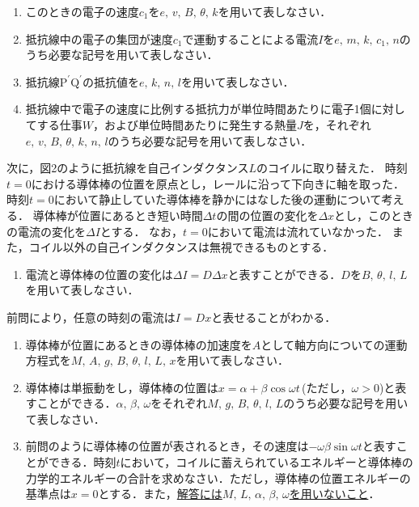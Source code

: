 \begin{enumerate}[（1）]
  \setlength{\leftskip}{-1zw}
  \setlength{\itemindent}{1zw}\setlength{\labelsep}{0.5zw}
  \setlength{\labelwidth}{1zw}\setlength{\leftmargin}{1zw}
  \setlength{\itemsep}{0.5\baselineskip}
  \addtocounter{enumi}{3}
  \item このときの電子の速度$c_1$を$e,\,v,\,B,\,\theta,\,k$を用いて表しなさい．
  \item 抵抗線中の電子の集団が速度$c_1$で運動することによる電流$I$を$e,\,m,\,k,\,c_1,\,n$のうち必要な記号を用いて表しなさい．
  \item 抵抗線$\text{P}^\prime\text{Q}^\prime$の抵抗値を$e,\,k,\,n,\,l$を用いて表しなさい．
  \item 抵抗線中で電子の速度に比例する抵抗力が単位時間あたりに電子1個に対してする仕事$W$，および単位時間あたりに発生する熱量$J$を，それぞれ$e,\,v,\,B,\,\theta,\,k,\,n,\,l$のうち必要な記号を用いて表しなさい．
\end{enumerate}

次に，図2のように抵抗線を自己インダクタンス$L$のコイルに取り替えた．
時刻$t=0$における導体棒の位置を原点とし，レールに沿って下向きに\x 軸を取った．
時刻$t=0$において静止していた導体棒を静かにはなした後の運動について考える．
導体棒が位置\x にあるとき短い時間$\Delta t$の間の位置の変化を$\Delta x$とし，このときの電流の変化を$\Delta I$とする．
なお，$t=0$において電流は流れていなかった．
また，コイル以外の自己インダクタンスは無視できるものとする．

\begin{enumerate}[（1）]
  \setlength{\leftskip}{-1zw}
  \setlength{\itemindent}{1zw}\setlength{\labelsep}{0.5zw}
  \setlength{\labelwidth}{1zw}\setlength{\leftmargin}{1zw}
  \setlength{\itemsep}{0.5\baselineskip}
  \addtocounter{enumi}{7}
  \item 電流と導体棒の位置の変化は$\Delta I=D\Delta x$と表すことができる．$D$を$B,\,\theta,\,l,\,L$を用いて表しなさい．
\end{enumerate}

前問により，任意の時刻の電流は$I=Dx$と表せることがわかる．

\begin{enumerate}[（1）]
  \setlength{\leftskip}{-1zw}
  \setlength{\itemindent}{1zw}\setlength{\labelsep}{0.5zw}
  \setlength{\labelwidth}{1zw}\setlength{\leftmargin}{1zw}
  \setlength{\itemsep}{0.5\baselineskip}
  \addtocounter{enumi}{8}
  \item 導体棒が位置\x にあるときの導体棒の加速度を$A$として\x 軸方向についての運動方程式を$M,\,A,\,g,\,B,\,\theta,\,l,\,L,\,x$を用いて表しなさい．
  \item 導体棒は単振動をし，導体棒の位置は$x=\alpha +\beta\cos{\omega t}$\,(ただし，$\omega>0$)と表すことができる．$\alpha,\,\beta,\,\omega$をそれぞれ$M,\,g,\,B,\,\theta,\,l,\,L$のうち必要な記号を用いて表しなさい．
  \item 前問のように導体棒の位置が表されるとき，その速度は$-\omega\beta\sin\omega t$と表すことができる．時刻$t$において，コイルに蓄えられているエネルギーと導体棒の力学的エネルギーの合計を求めなさい．ただし，導体棒の位置エネルギーの基準点は$x=0$とする．また，\underline{解答には$M,\,L,\,\alpha,\,\beta,\,\omega$を用いないこと}．
\end{enumerate}

